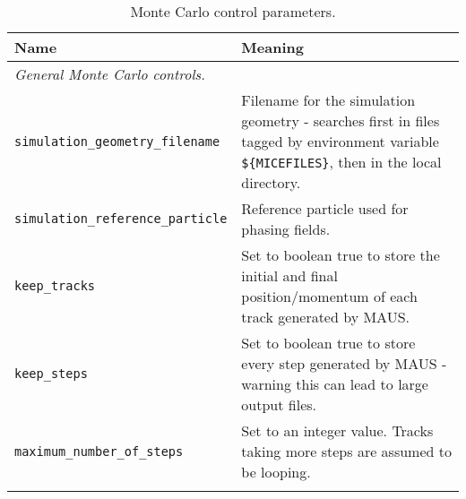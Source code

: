 \begin{table*}
\begin{center}
\caption{Monte Carlo control parameters.}
\begin{tabularx}{\textwidth}{lX}
Name & Meaning \\
\hline
\multicolumn{2}{l}{\emph{General Monte Carlo controls.}} \\
\hline
\verb|simulation_geometry_filename| & Filename for the simulation geometry - searches first in files tagged by environment variable \verb|${MICEFILES}|, then in the local directory.\\
\verb|simulation_reference_particle| & Reference particle used for phasing fields.\\
\verb|keep_tracks| & Set to boolean true to store the initial and final position/momentum of each track generated by MAUS.\\
\verb|keep_steps| & Set to boolean true to store every step generated by MAUS - warning this can lead to large output files.\\
\verb|maximum_number_of_steps| & Set to an integer value. Tracks taking more steps are assumed to be looping.\\
\begin{makeimage} %
\end{makeimage} 
\end{tabularx}
\end{center}
\end{table*}

